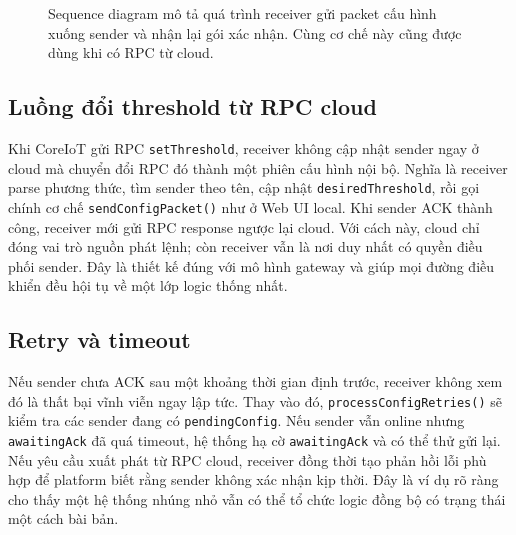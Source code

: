 \documentclass[12pt,a4paper]{report}
\begin{document}
\begin{figure}[H]
\centering
{}
\caption{Sequence diagram mô tả quá trình receiver gửi packet cấu hình xuống sender và nhận lại gói xác nhận. Cùng cơ chế này cũng được dùng khi có RPC từ cloud.}
\label{fig:config-seq}
\end{figure}

\subsection{Luồng đổi threshold từ RPC cloud}
Khi CoreIoT gửi RPC \texttt{setThreshold}, receiver không cập nhật sender ngay ở cloud mà chuyển đổi RPC đó thành một phiên cấu hình nội bộ. Nghĩa là receiver parse phương thức, tìm sender theo tên, cập nhật \texttt{desiredThreshold}, rồi gọi chính cơ chế \texttt{sendConfigPacket()} như ở Web UI local. Khi sender ACK thành công, receiver mới gửi RPC response ngược lại cloud. Với cách này, cloud chỉ đóng vai trò nguồn phát lệnh; còn receiver vẫn là nơi duy nhất có quyền điều phối sender. Đây là thiết kế đúng với mô hình gateway và giúp mọi đường điều khiển đều hội tụ về một lớp logic thống nhất.

\subsection{Retry và timeout}
Nếu sender chưa ACK sau một khoảng thời gian định trước, receiver không xem đó là thất bại vĩnh viễn ngay lập tức. Thay vào đó, \texttt{processConfigRetries()} sẽ kiểm tra các sender đang có \texttt{pendingConfig}. Nếu sender vẫn online nhưng \texttt{awaitingAck} đã quá timeout, hệ thống hạ cờ \texttt{awaitingAck} và có thể thử gửi lại. Nếu yêu cầu xuất phát từ RPC cloud, receiver đồng thời tạo phản hồi lỗi phù hợp để platform biết rằng sender không xác nhận kịp thời. Đây là ví dụ rõ ràng cho thấy một hệ thống nhúng nhỏ vẫn có thể tổ chức logic đồng bộ có trạng thái một cách bài bản.
\end{document}
